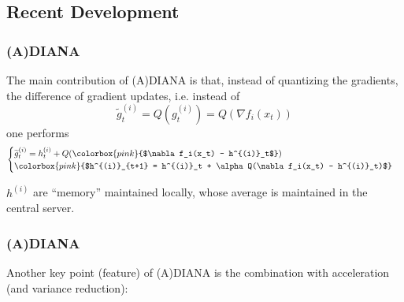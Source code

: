 
\subsection{Recent Development}


\begin{frame}
\frametitle{(A)DIANA}

The main contribution of (A)DIANA \cite{lizhize2020adiana,mishchenko2019diana} is that, instead of quantizing the gradients, the {\color{red} difference of gradient updates}, i.e. instead of
$$\widetilde{g}^{(i)}_t = Q(g^{(i)}_t) = Q(\nabla f_i(x_t))$$
one performs
\begin{equation*}
    \begin{cases}
    \widetilde{g}^{(i)}_t = h^{(i)}_t + Q(\colorbox{pink}{$\nabla f_i(x_t) - h^{(i)}_t$}) \\
    \colorbox{pink}{$h^{(i)}_{t+1} = h^{(i)}_t + \alpha Q(\nabla f_i(x_t) - h^{(i)}_t)$}
    \end{cases}
\end{equation*}

$h^{(i)}$ are ``memory'' maintained locally, whose average is maintained in the central server.


\end{frame}


\begin{frame}
\frametitle{(A)DIANA}

Another key point (feature) of (A)DIANA is the combination with acceleration (and variance reduction):


\end{frame}

